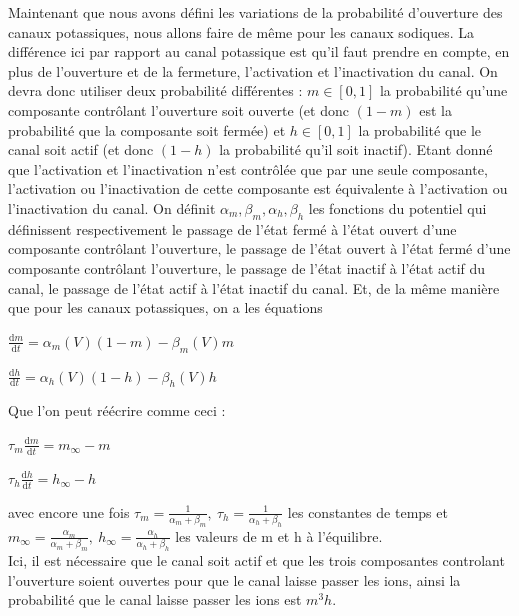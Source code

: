 \documentclass[12pt]{scrartcl}
\newcommand{\dd}{\mathrm{d}}
\begin{document}
Maintenant que nous avons défini les variations de la probabilité d'ouverture des canaux potassiques, nous allons faire de même pour les canaux sodiques. La différence ici par rapport au canal potassique est qu'il faut prendre en compte, en plus de l'ouverture et de la fermeture, l'activation et l'inactivation du canal. On devra donc utiliser deux probabilité différentes : $m \in [0,1]$ la probabilité qu'une composante contrôlant l'ouverture soit ouverte (et donc $(1-m)$ est la probabilité que la composante soit fermée) et $h \in [0,1]$ la probabilité que le canal soit actif (et donc $(1-h)$ la probabilité qu'il soit inactif). Etant donné que l'activation et l'inactivation n'est contrôlée que par une seule composante, l'activation ou l'inactivation de cette composante est équivalente à l'activation ou l'inactivation du canal. On définit $\alpha_m, \beta_m, \alpha_h, \beta_h$ les fonctions du potentiel qui définissent respectivement le passage de l'état fermé à l'état ouvert d'une composante contrôlant l'ouverture, le passage de l'état ouvert à l'état fermé d'une composante contrôlant l'ouverture, le passage de l'état inactif à l'état actif du canal, le passage de l'état actif à l'état inactif du canal. Et, de la même manière que pour les canaux potassiques, on a les équations 
\begin{center} $\displaystyle \frac{\dd m}{\dd t} = \alpha_m(V)(1-m) - \beta_m(V) m$ \end{center}
\begin{center} $\displaystyle \frac{\dd h}{\dd t} = \alpha_h(V)(1-h) - \beta_h(V) h$ \end{center}
Que l'on peut réécrire comme ceci :
\begin{center} $\displaystyle \tau_m \frac{\dd m}{\dd t} = m_{\infty} - m$ \end{center}
\begin{center} $\displaystyle \tau_h \frac{\dd h}{\dd t} = h_{\infty} - h$ \end{center}
avec encore une fois $\tau_m = \frac{1}{\alpha_m+\beta_m},~\tau_h = \frac{1}{\alpha_h+\beta_h} $ les constantes de temps et \\$m_\infty = \frac{\alpha_m}{\alpha_m+\beta_m},~h_\infty = \frac{\alpha_h}{\alpha_h+\beta_h}$ les valeurs de m et h à l'équilibre. \\
Ici, il est nécessaire que le canal soit actif et que les trois composantes controlant l'ouverture soient ouvertes pour que le canal laisse passer les ions, ainsi la probabilité que le canal laisse passer les ions est $m^3h$.
\end{document}
